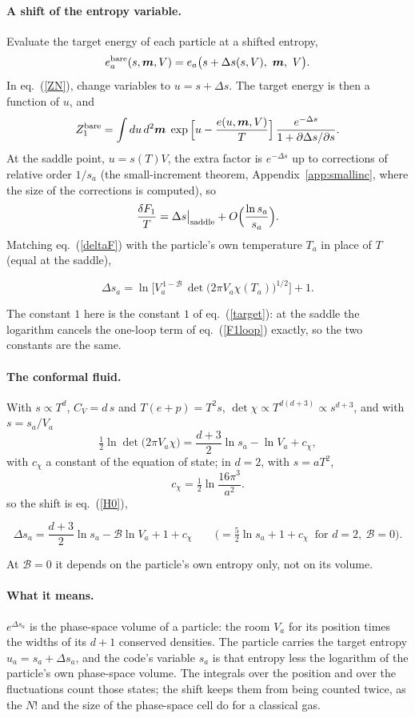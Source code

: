 \documentclass[11pt,aps,preprint,nofootinbib,superscriptaddress,tightenlines]{revtex4-2}
\newcommand{\klab}{\mathcal B}
\def\st{\begin{equation}}
\def\stp{\end{equation}}
\def\Eq#1{eq.~(\ref{#1})}
\def\App#1{Appendix~\ref{#1}}
\let\oldparagraph\paragraph
\renewcommand{\paragraph}{\par\bigskip\oldparagraph}
\begin{document}
\paragraph{A shift of the entropy variable.}  Evaluate the target energy of each particle at a shifted entropy,
\st
e_a^{\rm bare}(s,\bm m,V)=e_a\big(s+\Delta s(s,V),\ \bm m,\ V\big) .
\stp
In \Eq{ZN}, change variables to $u=s+\Delta s$.  The target energy is then a function of $u$, and
\st
Z_1^{\rm bare}=\int du\,d^2\bm m\;\exp\Big[u-\frac{e(u,\bm m,V)}T\Big]\,\frac{e^{-\Delta s}}{1+\partial\Delta s/\partial s} .
\stp
At the saddle point, $u=s(T)V$, the extra factor is $e^{-\Delta s}$ up to corrections of relative order $1/s_a$ (the small-increment theorem,
\App{app:smallinc}, where the size of the corrections is computed), so
\st
\frac{\delta F_1}T=\Delta s\big|_{\rm saddle}+O\Big(\frac{\ln s_a}{s_a}\Big) .
\stp
Matching \Eq{deltaF} with the particle's own temperature $T_a$ in place of $T$ (equal at the saddle),
\begin{keyeq}
\st
\Delta s_a=\ln\Big[V_a^{\,1-\klab}\,\det\big(2\pi V_a\chi(T_a)\big)^{1/2}\Big]+1 .
\label{Deltas}
\stp
\end{keyeq}
The constant $1$ here is the constant $1$ of \Eq{target}: at the saddle the logarithm cancels the one-loop term of \Eq{F1loop} exactly, so the two
constants are the same.

\paragraph{The conformal fluid.}  With $s\propto T^d$, $C_V=d\,s$ and $T(e+p)=T^2s$, $\det\chi\propto T^{d(d+3)}\propto s^{d+3}$, and with $s=s_a/V_a$
\st
\tfrac12\ln\det\big(2\pi V_a\chi\big)=\frac{d+3}2\ln s_a-\ln V_a+c_\chi ,
\stp
with $c_\chi$ a constant of the equation of state; in $d=2$, with $s=aT^2$,
\st
c_\chi=\tfrac12\ln\frac{16\pi^3}{a^2} .
\label{cchi}
\stp
so the shift is \Eq{H0},
\begin{keyeq}
\st
\Delta s_a=\frac{d+3}2\ln s_a-\klab\ln V_a+1+c_\chi\qquad\Big(=\tfrac52\ln s_a+1+c_\chi\ \text{ for }d=2,\ \klab=0\Big).
\label{Deltasconf}
\stp
\end{keyeq}
At $\klab=0$ it depends on the particle's own entropy only, not on its volume.

\paragraph{What it means.}  $e^{\Delta s_a}$ is the phase-space volume of a particle: the room $V_a$ for its position times the widths of its $d+1$ conserved
densities.  The particle carries the target entropy $u_a=s_a+\Delta s_a$, and the code's variable $s_a$ is that entropy less the logarithm of the particle's own
phase-space volume.  The integrals over the position and over the fluctuations count those states; the shift keeps them from being counted twice, as the $N!$
and the size of the phase-space cell do for a classical gas.
\end{document}
